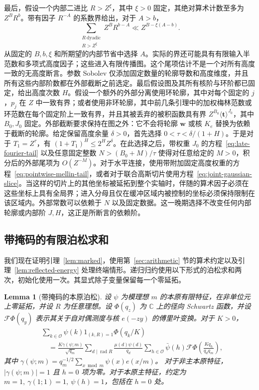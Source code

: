 \documentclass[11pt,a4paper]{article}
\numberwithin{equation}{section}
\numberwithin{figure}{section}
\newtheorem{lemma}[theorem]{Lemma}
\theoremstyle{definition}
\theoremstyle{remark}
\begin{document}
最后，假设一个内部二进比 $R>Z^\xi$，其中 $\xi>0$ 固定，其绝对算术计数至多为 $Z^B R^b$。带有因子 $R^{-A}$ 的系数界给出，对于 $A>b$，
\[
 \sum_{\substack{R\ \mathrm{dyadic}\\R>Z^\xi}}Z^B R^{b-A}
       \ll Z^{B-\xi(A-b)}.
\]
从固定的 $B,b,\xi$ 和所期望的内部节省中选择 $A$。实际的界还可能具有有限输入半范数和多项式高度因子；这些进入有限传播图。这个尾项估计不是一个对所有高度一致的无高度断言。参数 Sobolev 仅添加固定数量的轮廓导数和高度维度，并且所有这些内部阶数都在外部截断之前选定。最后假设图及其所有核阶与环阶都已固定，给出高度次数 $H$。假设一个额外的外部分离使用环轮廓，其中对每个固定的 $j$，$p_j$ 在 $Z$ 中一致有界；或者使用非环轮廓，其中前几条引理中的加权梅林范数或环范数在每个固定阶上一致有界，并且其被丢弃的被积函数具有界 $Z^{B_0}\langle\boldsymbol t\rangle^{J_0}$，其中 $B_0,J_0$ 固定。外部截断要求保持在图之外：它不会将轮廓 $\boldsymbol w$ 或核 $K_e$ 替换为依赖于截断的轮廓。给定保留高度余量 $\delta>0$，首先选择 $0<\tau<\delta/(1+H)$。于是对于 $T_1=Z^\tau$，有 $(1+T_1)^H\le2^H Z^\delta$。在此选择之后，带权重 $J_0$ 的方程~\eqref{eq:late-fourier-tail} 以及任意固定整数 $N>(B_0+M)/\tau$ 使得对任意给定的 $M>0$，积分后的外部尾项为 $O(Z^{-M})$。对于水平连接，使用带附加固定高度权重的方程~\eqref{eq:pointwise-mellin-tail}，或者对于联合高斯切片使用方程~\eqref{eq:joint-gaussian-slice}。当这样的切片上的其他坐标被延拓到整个实轴时，伴随的算术因子必须在这些坐标上具有全局界；进入分母且仅在缓冲区域内被控制的坐标必须保持限制在该区域内。外部常数可以依赖于 $N$ 以及固定数据。这一晚期选择不改变任何内部轮廓或内部阶 $J,H$，这正是所断言的依赖阶。

\subsection{带掩码的有限泊松求和}

我们现在证明引理~\ref{lem:marked}，使用第~\ref{sec:arithmetic} 节的算术约定以及引理~\ref{lem:reflected-energy} 处理终端情形。递归归约使用以下形式的泊松求和两次，初始化使用一次。其显式除子变量保留每一个零延拓。

\begin{lemma}[带掩码的本原泊松]\label{lem:masked-poisson}
设 \(\psi\) 为模理想 \(m\) 的本原有限特征，在非单位元上零延拓，并设 \(R\) 为任意理想。设 \(\Phi(q_z)\) 为 \(\mathbb C\) 上的径向 Schwartz 函数，并设 \(\mathcal F\Phi(q_y)\) 表示其关于自对偶测度与核 \(e(-zy)\) 的傅里叶变换。对于 \(K>0\)，
\begin{equation}\label{eq:masked-poisson}
 \begin{split}
 &\sum_{k\in\mathcal O}\psi(k)1_{(k,R)=1}\Phi(q_k/K)\\
 &\quad=\frac{K\gamma(\psi;m)}{\sqrt{q_m}}
 \sum_{d\mid\operatorname{rad}R}\frac{\mu(d)\psi(d)}{q_d}
 \sum_{h\in\mathcal O}\bar\psi(h)
       \mathcal F\Phi\!\left(\frac{Kq_h}{q_dq_m}\right),
 \end{split}
\end{equation}
其中
\(\gamma(\psi;m)=q_m^{-1/2}\sum_{x\bmod m}\psi(x)e(x/m)\)。
对于非主本原特征，\(|\gamma(\psi;m)|=1\) 且 \(h=0\) 项为零。对于本原主特征，约定为 \(m=1,\ \gamma(1;1)=1,\ \psi(h)=1\)，包括在 \(h=0\) 处。
\end{lemma}
\end{document}
